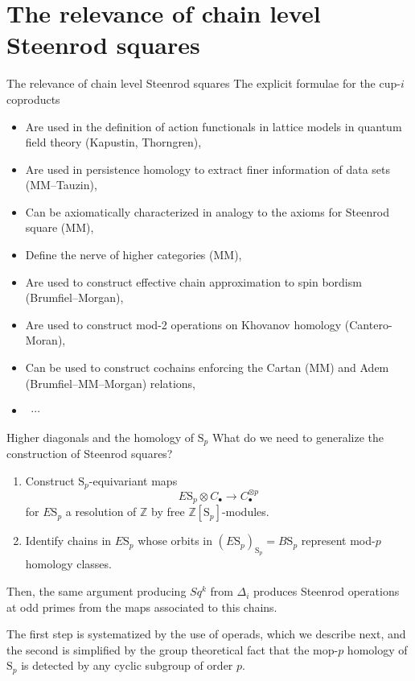 \documentclass[10pt,t]{beamer} %
\renewcommand{\S}{\mathrm{S}}
\begin{document}
\section{The relevance of chain level Steenrod squares}

\begin{frame}{The relevance of chain level Steenrod squares}
	The explicit formulae for the cup-$i$ coproducts	
	\begin{itemize}
		\item Are used in the definition of action functionals in lattice models in quantum field theory (Kapustin, Thorngren), \pause
		\item Are used in persistence homology to extract finer information of data sets (MM--Tauzin), \pause
		\item Can be axiomatically characterized in analogy to the axioms for Steenrod square (MM), \pause
		\item Define the nerve of higher categories (MM), \pause
		\item Are used to construct effective chain approximation to spin bordism (Brumfiel--Morgan), \pause
		\item Are used to construct mod-2 operations on Khovanov homology (Cantero-Moran), \pause
		\item Can be used to construct cochains enforcing the Cartan (MM) and Adem (Brumfiel--MM--Morgan) relations,
		\item \ $\cdots$
	\end{itemize}
\end{frame}


\begin{frame}{Higher diagonals and the homology of $\S_p$}
	What do we need to generalize the construction of Steenrod squares?
	
	\pause \vspace{10pt}
	
	\begin{enumerate}
		\item Construct $\S_p$-equivariant maps
		\begin{equation*}
		E\S_p \otimes C_\bullet \to C_\bullet^{\otimes p}
		\end{equation*}
		for $E\S_p$ a resolution of $\mathbb Z$ by free $\mathbb Z[\S_p]$-modules.
		\vspace*{10pt} \pause
		\item Identify chains in $E\S_p$ whose orbits in $(E\S_p)_{\S_p} = B\S_p$ represent mod-$p$ homology classes.
	\end{enumerate}
	
	\vspace*{10pt}\pause

	Then, the same argument producing $Sq^k$ from $\Delta_i$ produces Steenrod operations at odd primes from the maps associated to this chains.

	\vspace*{10pt}\pause

	The first step is systematized by the use of operads, which we describe next, and the second is simplified by the group theoretical fact that the mop-$p$ homology of $\S_p$ is detected by any cyclic subgroup of order $p$.
\end{frame}
\end{document}
